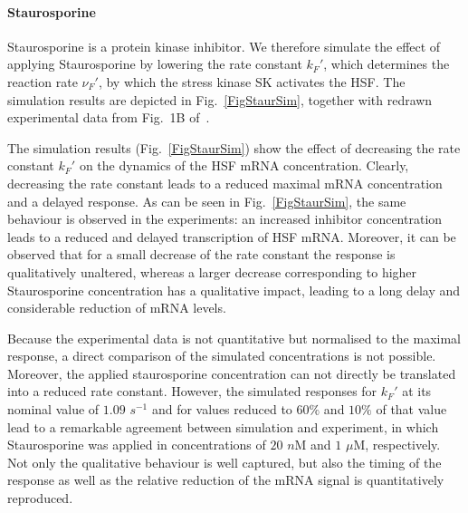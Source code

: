 \documentclass[oneside, 10pt, a4paper, twocolumn]{article}
\begin{document}



\paragraph{Staurosporine}

Staurosporine is a protein kinase inhibitor.
We therefore simulate the effect of applying Staurosporine by lowering the rate constant $k_F'$, 
which determines the reaction rate $\nu_F'$, by which the stress kinase SK activates the HSF. 
The simulation results are depicted in Fig.~\ref{FigStaurSim}, together with redrawn 
experimental data from Fig.~1B of~\cite{Schmollinger2013}.

The simulation results (Fig.~\ref{FigStaurSim}) show
the effect of decreasing the rate constant $k_F'$ on the dynamics
of the HSF mRNA concentration. Clearly, decreasing the rate constant
leads to a reduced maximal mRNA concentration and a delayed response.
As can be seen in Fig.~\ref{FigStaurSim},
the same behaviour is observed in the experiments: an increased
inhibitor concentration leads to a reduced and delayed transcription
of HSF mRNA.
Moreover, it can be observed that for a small decrease of the
rate constant the response is qualitatively unaltered, whereas a larger decrease corresponding
to higher Staurosporine concentration has a qualitative impact, leading
to a long delay and considerable reduction of mRNA levels.

Because the experimental data is not quantitative but normalised 
to the maximal response, a direct comparison of the simulated
concentrations is not possible. Moreover, the applied staurosporine
concentration can not directly be translated into a reduced rate
constant.
However, the simulated responses for $k_F'$ at its nominal value of $1.09$ $s^{-1}$ and for values reduced to $60 \%$ and $10 \%$ of that value lead to a remarkable agreement
between simulation and experiment, in which Staurosporine was applied 
in concentrations of $20$ $n$M and $1$ $\mu$M, respectively.
Not only the qualitative behaviour is well captured, but also the
timing of the response as well as the relative reduction of the mRNA signal
is quantitatively reproduced.
\end{document}
